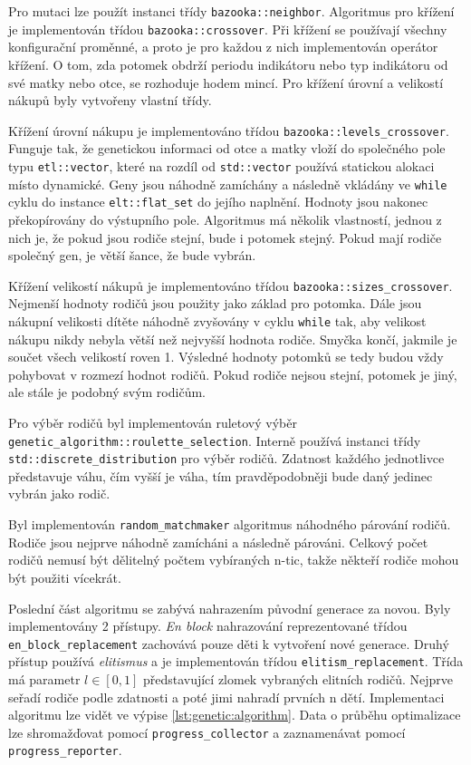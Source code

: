 Pro mutaci lze použít instanci třídy \texttt{bazooka::neighbor}.
Algoritmus pro křížení je implementován třídou \texttt{bazooka::crossover}.
Při křížení se používají všechny konfigurační proměnné, a proto je pro každou z nich implementován operátor křížení.
O tom, zda potomek obdrží periodu indikátoru nebo typ indikátoru od své matky nebo otce, se rozhoduje hodem mincí.
Pro křížení úrovní a velikostí nákupů byly vytvořeny vlastní třídy.

Křížení úrovní nákupu je implementováno třídou \texttt{bazooka::levels\_crossover}.
Funguje tak, že genetickou informaci od otce a matky vloží do společného pole typu \texttt{etl::vector}, které na rozdíl od \texttt{std::vector} používá statickou alokaci místo dynamické.
Geny jsou náhodně zamíchány a následně vkládány ve \texttt{while} cyklu do instance \texttt{elt::flat\_set} do jejího naplnění.
Hodnoty jsou nakonec překopírovány do výstupního pole.
Algoritmus má několik vlastností, jednou z nich je, že pokud jsou rodiče stejní, bude i potomek stejný.
Pokud mají rodiče společný gen, je větší šance, že bude vybrán.

Křížení velikostí nákupů je implementováno třídou \texttt{bazooka::sizes\_crossover}.
Nejmenší hodnoty rodičů jsou použity jako základ pro potomka.
Dále jsou nákupní velikosti dítěte náhodně zvyšovány v cyklu \texttt{while} tak, aby velikost nákupu nikdy nebyla větší než nejvyšší hodnota rodiče.
Smyčka končí, jakmile je součet všech velikostí roven 1.
Výsledné hodnoty potomků se tedy budou vždy pohybovat v rozmezí hodnot rodičů.
Pokud rodiče nejsou stejní, potomek je jiný, ale stále je podobný svým rodičům.

Pro výběr rodičů byl implementován ruletový výběr \texttt{genetic\_algorithm::roulette\_selection}.
Interně používá instanci třídy \texttt{std::discrete\_distribution} pro výběr rodičů.
Zdatnost každého jednotlivce představuje váhu, čím vyšší je váha, tím pravděpodobněji bude daný jedinec vybrán jako rodič.

Byl implementován \texttt{random\_matchmaker} algoritmus náhodného párování rodičů.
Rodiče jsou nejprve náhodně zamícháni a následně párováni.
Celkový počet rodičů nemusí být dělitelný počtem vybíraných n-tic, takže někteří rodiče mohou být použiti vícekrát.

Poslední část algoritmu se zabývá nahrazením původní generace za novou.
Byly implementovány 2 přístupy.
\textit{En block} nahrazování reprezentované třídou \texttt{en\_block\_replacement} zachovává pouze děti k vytvoření nové generace.
Druhý přístup používá \textit{elitismus} a je implementován třídou \texttt{elitism\_replacement}.
Třída má parametr $l\in[0, 1]$ představující zlomek vybraných elitních rodičů.
Nejprve seřadí rodiče podle zdatnosti a poté jimi nahradí prvních n dětí.
Implementaci algoritmu lze vidět ve výpise \ref{lst:genetic:algorithm}.
Data o průběhu optimalizace lze shromažďovat pomocí \texttt{progress\_collector} a zaznamenávat pomocí \texttt{progress\_reporter}.

